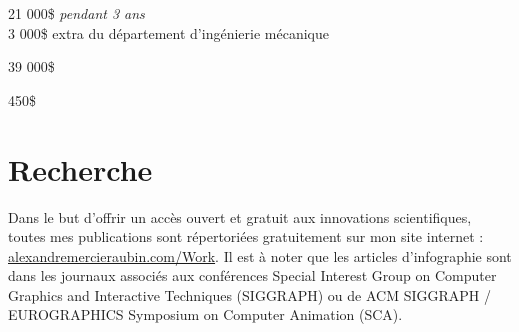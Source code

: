 \documentclass[10pt]{article} %
\begin{document}
{
 21 000\$ \textit{pendant 3 ans} \\
 3 000\$ extra du département d'ingénierie mécanique\\
}

{
\textit{} 39 000\$\\
}


{
\textit{} 450\$\\
}

\section{Recherche}
Dans le but d'offrir un accès ouvert et gratuit aux innovations scientifiques, toutes mes publications sont répertoriées gratuitement sur mon site internet : \href{https://alexandremercieraubin.com/Work}{alexandremercieraubin.com/Work}. Il est à noter que les articles d'infographie sont dans les journaux associés aux conférences Special Interest Group on Computer Graphics and Interactive Techniques (SIGGRAPH) ou de ACM SIGGRAPH / EUROGRAPHICS Symposium on Computer Animation (SCA).
\end{document}
